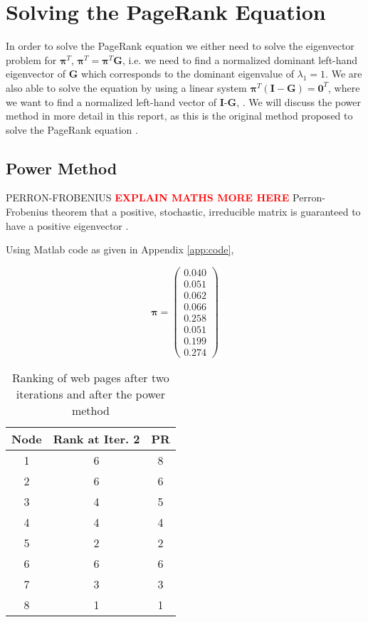 \section{Solving the PageRank Equation} \label{sec:solve}
In order to solve the PageRank equation we either need to solve the eigenvector problem for $\boldsymbol{\pi}^T$, \(\boldsymbol{\pi}^T = \boldsymbol{\pi}^T\textbf{G}\), i.e. we need to find a normalized dominant left-hand eigenvector of \textbf{G} which corresponds to the dominant eigenvalue of $\lambda_1 = 1$. We are also able to solve the equation by using a linear system \(\boldsymbol{\pi}^T(\textbf{I}-\textbf{G})=\textbf{0}^T\), where we want to find a normalized left-hand vector of \textbf{I}-\textbf{G}, \cite{langville}. We will discuss the power method in more detail in this report, as this is the original method proposed to solve the PageRank equation \cite{langville}.

\subsection{Power Method} \label{sec:power}
PERRON-FROBENIUS \cite{meyer2000matrix}  \cite{gallager1992discrete} 
\textcolor{red}{\textbf{EXPLAIN MATHS MORE HERE}} Perron-Frobenius theorem that a positive, stochastic, irreducible matrix is guaranteed to have a positive eigenvector \cite{thorson2004modeling}.

Using Matlab code as given in Appendix \ref{app:code}, 

\[\boldsymbol\pi = \left(
\begin{array}{c}
0.040 \\
0.051 \\
0.062 \\
0.066 \\
0.258 \\
0.051 \\
0.199 \\
0.274
\end{array}
\right)\]

\begin{table}[H] \caption{Ranking of web pages after two iterations and after the power method}
 \centering
 \begin{tabular} {c| c c} 
 Node & Rank at Iter. 2 & PR \\ [0.5ex] 
 \hline
 1&6&8\\
 2&6&6\\
 3&4&5\\
 4&4&4\\
 5&2&2\\
 6&6&6\\
 7&3&3\\
 8&1&1\\
 \end{tabular}
 \label{Table:PR and summ}
\end{table}

